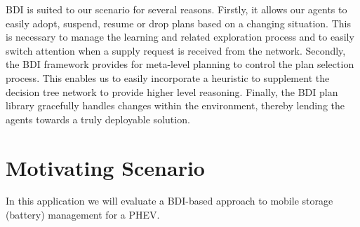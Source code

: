 \documentclass[a4paper]{article}
\begin{document}
BDI is suited to our scenario for several reasons. Firstly, it allows our agents to easily adopt, suspend, resume or drop plans based on a changing situation. This is necessary to manage the learning and related exploration process and to easily switch attention when a supply request is received from the network. Secondly, the BDI framework provides for meta-level planning to control the plan selection process. This enables us to easily incorporate a heuristic to supplement the decision tree network to provide higher level reasoning. Finally, the BDI plan library gracefully handles changes within the environment, thereby lending the agents towards a truly deployable solution.

\section{Motivating Scenario}

In this application we will evaluate a BDI-based approach to mobile storage (battery) management for a PHEV. 


%
\end{document}
